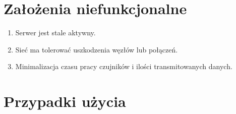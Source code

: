 \documentclass[a4paper,11pt]{article}
\begin{document}
\section{Założenia niefunkcjonalne}

\begin{enumerate}
  \item Serwer jest stale aktywny.
  \item Sieć ma tolerować uszkodzenia węzłów lub połączeń.
  \item Minimalizacja czasu pracy czujników i ilości transmitowanych danych.
\end{enumerate}

\section{Przypadki użycia}\label{PU}
\end{document}
